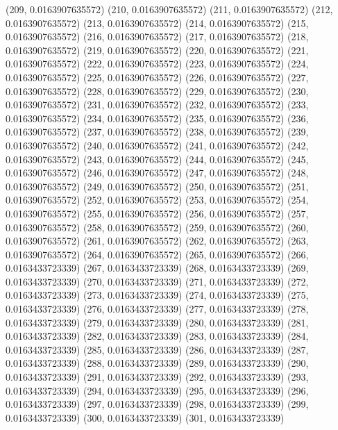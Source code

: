 {					(209, 0.0163907635572)
					(210, 0.0163907635572)
					(211, 0.0163907635572)
					(212, 0.0163907635572)
					(213, 0.0163907635572)
					(214, 0.0163907635572)
					(215, 0.0163907635572)
					(216, 0.0163907635572)
					(217, 0.0163907635572)
					(218, 0.0163907635572)
					(219, 0.0163907635572)
					(220, 0.0163907635572)
					(221, 0.0163907635572)
					(222, 0.0163907635572)
					(223, 0.0163907635572)
					(224, 0.0163907635572)
					(225, 0.0163907635572)
					(226, 0.0163907635572)
					(227, 0.0163907635572)
					(228, 0.0163907635572)
					(229, 0.0163907635572)
					(230, 0.0163907635572)
					(231, 0.0163907635572)
					(232, 0.0163907635572)
					(233, 0.0163907635572)
					(234, 0.0163907635572)
					(235, 0.0163907635572)
					(236, 0.0163907635572)
					(237, 0.0163907635572)
					(238, 0.0163907635572)
					(239, 0.0163907635572)
					(240, 0.0163907635572)
					(241, 0.0163907635572)
					(242, 0.0163907635572)
					(243, 0.0163907635572)
					(244, 0.0163907635572)
					(245, 0.0163907635572)
					(246, 0.0163907635572)
					(247, 0.0163907635572)
					(248, 0.0163907635572)
					(249, 0.0163907635572)
					(250, 0.0163907635572)
					(251, 0.0163907635572)
					(252, 0.0163907635572)
					(253, 0.0163907635572)
					(254, 0.0163907635572)
					(255, 0.0163907635572)
					(256, 0.0163907635572)
					(257, 0.0163907635572)
					(258, 0.0163907635572)
					(259, 0.0163907635572)
					(260, 0.0163907635572)
					(261, 0.0163907635572)
					(262, 0.0163907635572)
					(263, 0.0163907635572)
					(264, 0.0163907635572)
					(265, 0.0163907635572)
					(266, 0.0163433723339)
					(267, 0.0163433723339)
					(268, 0.0163433723339)
					(269, 0.0163433723339)
					(270, 0.0163433723339)
					(271, 0.0163433723339)
					(272, 0.0163433723339)
					(273, 0.0163433723339)
					(274, 0.0163433723339)
					(275, 0.0163433723339)
					(276, 0.0163433723339)
					(277, 0.0163433723339)
					(278, 0.0163433723339)
					(279, 0.0163433723339)
					(280, 0.0163433723339)
					(281, 0.0163433723339)
					(282, 0.0163433723339)
					(283, 0.0163433723339)
					(284, 0.0163433723339)
					(285, 0.0163433723339)
					(286, 0.0163433723339)
					(287, 0.0163433723339)
					(288, 0.0163433723339)
					(289, 0.0163433723339)
					(290, 0.0163433723339)
					(291, 0.0163433723339)
					(292, 0.0163433723339)
					(293, 0.0163433723339)
					(294, 0.0163433723339)
					(295, 0.0163433723339)
					(296, 0.0163433723339)
					(297, 0.0163433723339)
					(298, 0.0163433723339)
					(299, 0.0163433723339)
					(300, 0.0163433723339)
					(301, 0.0163433723339)
}
